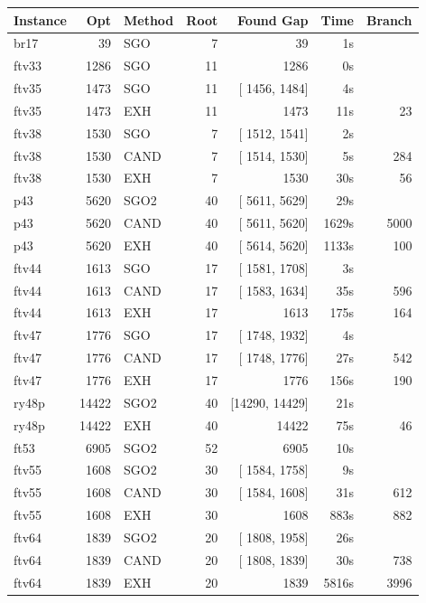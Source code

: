 \documentclass[a4paper,11pt,twoside]{book}
\begin{document}
\begin{multicols}{2}
\bigskip
\begin{center}
\small
\begin{tabular}{|lrlrrrr|}
\hline
{\bf Instance} & {\bf Opt} & {\bf Method} & {\bf Root} & {\bf Found Gap} & {\bf Time} & {\bf Branch} \\
\hline
\hline
br17      &     39 &  SGO &   7 &            39  &     1s & \\
ftv33     &   1286 &  SGO &  11 &          1286  &     0s & \\
ftv35     &   1473 &  SGO &  11 & [ 1456,  1484] &     4s & \\
ftv35     &   1473 &  EXH &  11 &          1473  &    11s &    23 \\
ftv38     &   1530 &  SGO &   7 & [ 1512,  1541] &     2s & \\
ftv38     &   1530 & CAND &   7 & [ 1514,  1530] &     5s &   284 \\
ftv38     &   1530 &  EXH &   7 &          1530  &    30s &    56 \\
p43       &   5620 & SGO2 &  40 & [ 5611,  5629] &    29s & \\
p43       &   5620 & CAND &  40 & [ 5611,  5620] &  1629s &  5000 \\
p43       &   5620 &  EXH &  40 & [ 5614,  5620] &  1133s &   100 \\
ftv44     &   1613 &  SGO &  17 & [ 1581,  1708] &     3s & \\
ftv44     &   1613 & CAND &  17 & [ 1583,  1634] &    35s &   596 \\
ftv44     &   1613 &  EXH &  17 &          1613  &   175s &   164 \\
ftv47     &   1776 &  SGO &  17 & [ 1748,  1932] &     4s & \\
ftv47     &   1776 & CAND &  17 & [ 1748,  1776] &    27s &   542 \\
ftv47     &   1776 &  EXH &  17 &          1776  &   156s &   190 \\
ry48p     &  14422 & SGO2 &  40 & [14290, 14429] &    21s & \\
ry48p     &  14422 &  EXH &  40 &         14422  &    75s &    46 \\
ft53      &   6905 & SGO2 &  52 &          6905  &    10s & \\
ftv55     &   1608 & SGO2 &  30 & [ 1584,  1758] &     9s & \\
ftv55     &   1608 & CAND &  30 & [ 1584,  1608] &    31s &   612 \\
ftv55     &   1608 &  EXH &  30 &          1608  &   883s &   882 \\
ftv64     &   1839 & SGO2 &  20 & [ 1808,  1958] &    26s & \\
ftv64     &   1839 & CAND &  20 & [ 1808,  1839] &    30s &  738 \\
ftv64     &   1839 &  EXH &  20 &          1839  &  5816s & 3996 \\
\hline
\end{tabular}
\end{center}


\end{multicols}
\end{document}
